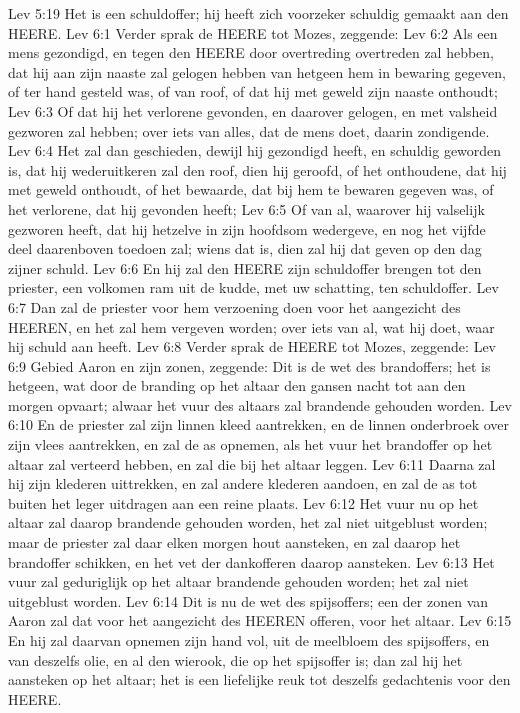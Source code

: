 Lev 5:19  Het is een schuldoffer; hij heeft zich voorzeker schuldig gemaakt aan den HEERE.
Lev 6:1  Verder sprak de HEERE tot Mozes, zeggende:
Lev 6:2  Als een mens gezondigd, en tegen den HEERE door overtreding overtreden zal hebben, dat hij aan zijn naaste zal gelogen hebben van hetgeen hem in bewaring gegeven, of ter hand gesteld was, of van roof, of dat hij met geweld zijn naaste onthoudt;
Lev 6:3  Of dat hij het verlorene gevonden, en daarover gelogen, en met valsheid gezworen zal hebben; over iets van alles, dat de mens doet, daarin zondigende.
Lev 6:4  Het zal dan geschieden, dewijl hij gezondigd heeft, en schuldig geworden is, dat hij wederuitkeren zal den roof, dien hij geroofd, of het onthoudene, dat hij met geweld onthoudt, of het bewaarde, dat bij hem te bewaren gegeven was, of het verlorene, dat hij gevonden heeft;
Lev 6:5  Of van al, waarover hij valselijk gezworen heeft, dat hij hetzelve in zijn hoofdsom wedergeve, en nog het vijfde deel daarenboven toedoen zal; wiens dat is, dien zal hij dat geven op den dag zijner schuld.
Lev 6:6  En hij zal den HEERE zijn schuldoffer brengen tot den priester, een volkomen ram uit de kudde, met uw schatting, ten schuldoffer.
Lev 6:7  Dan zal de priester voor hem verzoening doen voor het aangezicht des HEEREN, en het zal hem vergeven worden; over iets van al, wat hij doet, waar hij schuld aan heeft.
Lev 6:8  Verder sprak de HEERE tot Mozes, zeggende:
Lev 6:9  Gebied Aaron en zijn zonen, zeggende: Dit is de wet des brandoffers; het is hetgeen, wat door de branding op het altaar den gansen nacht tot aan den morgen opvaart; alwaar het vuur des altaars zal brandende gehouden worden.
Lev 6:10  En de priester zal zijn linnen kleed aantrekken, en de linnen onderbroek over zijn vlees aantrekken, en zal de as opnemen, als het vuur het brandoffer op het altaar zal verteerd hebben, en zal die bij het altaar leggen.
Lev 6:11  Daarna zal hij zijn klederen uittrekken, en zal andere klederen aandoen, en zal de as tot buiten het leger uitdragen aan een reine plaats.
Lev 6:12  Het vuur nu op het altaar zal daarop brandende gehouden worden, het zal niet uitgeblust worden; maar de priester zal daar elken morgen hout aansteken, en zal daarop het brandoffer schikken, en het vet der dankofferen daarop aansteken.
Lev 6:13  Het vuur zal geduriglijk op het altaar brandende gehouden worden; het zal niet uitgeblust worden.
Lev 6:14  Dit is nu de wet des spijsoffers; een der zonen van Aaron zal dat voor het aangezicht des HEEREN offeren, voor het altaar.
Lev 6:15  En hij zal daarvan opnemen zijn hand vol, uit de meelbloem des spijsoffers, en van deszelfs olie, en al den wierook, die op het spijsoffer is; dan zal hij het aansteken op het altaar; het is een liefelijke reuk tot deszelfs gedachtenis voor den HEERE.
